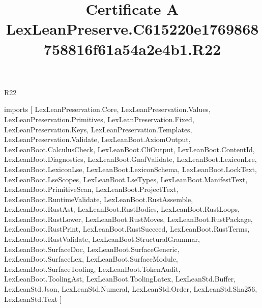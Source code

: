\begin{lexlean}{R22}
\title{Certificate A LexLeanPreserve.C615220e1769868758816f61a54a2e4b1.R22}
\begin{coremodule}
imports [
  LexLeanPreservation.Core,
  LexLeanPreservation.Values,
  LexLeanPreservation.Primitives,
  LexLeanPreservation.Fixed,
  LexLeanPreservation.Keys,
  LexLeanPreservation.Templates,
  LexLeanPreservation.Validate,
  LexLeanBoot.AxiomOutput,
  LexLeanBoot.CalculusCheck,
  LexLeanBoot.CliOutput,
  LexLeanBoot.ContentId,
  LexLeanBoot.Diagnostics,
  LexLeanBoot.GnafValidate,
  LexLeanBoot.LexiconLre,
  LexLeanBoot.LexiconLse,
  LexLeanBoot.LexiconSchema,
  LexLeanBoot.LockText,
  LexLeanBoot.LseScopes,
  LexLeanBoot.LseTypes,
  LexLeanBoot.ManifestText,
  LexLeanBoot.PrimitiveScan,
  LexLeanBoot.ProjectText,
  LexLeanBoot.RuntimeValidate,
  LexLeanBoot.RustAssemble,
  LexLeanBoot.RustAst,
  LexLeanBoot.RustBodies,
  LexLeanBoot.RustLoops,
  LexLeanBoot.RustLower,
  LexLeanBoot.RustMoves,
  LexLeanBoot.RustPackage,
  LexLeanBoot.RustPrint,
  LexLeanBoot.RustSucceed,
  LexLeanBoot.RustTerms,
  LexLeanBoot.RustValidate,
  LexLeanBoot.StructuralGrammar,
  LexLeanBoot.SurfaceDoc,
  LexLeanBoot.SurfaceGeneric,
  LexLeanBoot.SurfaceLex,
  LexLeanBoot.SurfaceModule,
  LexLeanBoot.SurfaceTooling,
  LexLeanBoot.TokenAudit,
  LexLeanBoot.ToolingAst,
  LexLeanBoot.ToolingLatex,
  LexLeanStd.Buffer,
  LexLeanStd.Json,
  LexLeanStd.Numeral,
  LexLeanStd.Order,
  LexLeanStd.Sha256,
  LexLeanStd.Text
]


\end{coremodule}
\end{lexlean}
